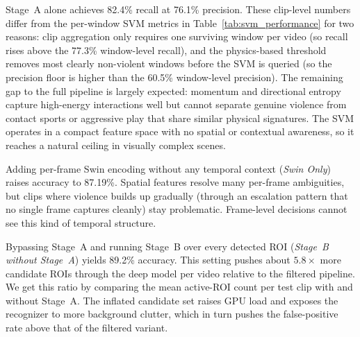 \documentclass[conference]{IEEEtran}
\begin{document}
\begin{table}[!htbp]
\centering
\caption{Ablation study at the \textbf{clip level} on the 1{,}149-clip Unified Benchmark test set. For \textit{Stage~A Only}, a clip is predicted violent if any of its sliding windows passes the physics threshold and is then classified violent by the SVM.}
\label{tab:ablation}
\end{table}

Stage~A alone achieves 82.4\% recall at 76.1\% precision. These clip-level numbers differ from the per-window SVM metrics in Table~\ref{tab:svm_performance} for two reasons: clip aggregation only requires one surviving window per video (so recall rises above the 77.3\% window-level recall), and the physics-based threshold removes most clearly non-violent windows before the SVM is queried (so the precision floor is higher than the 60.5\% window-level precision). The remaining gap to the full pipeline is largely expected: momentum and directional entropy capture high-energy interactions well but cannot separate genuine violence from contact sports or aggressive play that share similar physical signatures. The SVM operates in a compact feature space with no spatial or contextual awareness, so it reaches a natural ceiling in visually complex scenes.

Adding per-frame Swin encoding without any temporal context (\textit{Swin Only}) raises accuracy to 87.19\%. Spatial features resolve many per-frame ambiguities, but clips where violence builds up gradually (through an escalation pattern that no single frame captures cleanly) stay problematic. Frame-level decisions cannot see this kind of temporal structure.

Bypassing Stage~A and running Stage~B over every detected ROI (\textit{Stage~B without Stage~A}) yields 89.2\% accuracy. This setting pushes about $5.8\times$ more candidate ROIs through the deep model per video relative to the filtered pipeline. We get this ratio by comparing the mean active-ROI count per test clip with and without Stage~A. The inflated candidate set raises GPU load and exposes the recognizer to more background clutter, which in turn pushes the false-positive rate above that of the filtered variant.
\end{document}
